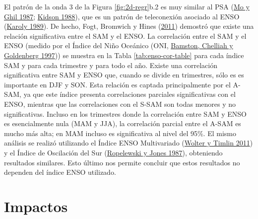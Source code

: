 \documentclass[12pt,oneside,a4paper]{reedthesis}
\begin{document}
El patrón de la onda 3 de la Figura \ref{fig:2d-regr}b.2 es muy similar al PSA (\protect\hyperlink{ref-mo1987}{Mo y Ghil 1987}; \protect\hyperlink{ref-kidson1988}{Kidson 1988}), que es un patrón de teleconexión asociado al ENSO (\protect\hyperlink{ref-karoly1989}{Karoly 1989}).
De hecho, Fogt, Bromwich y Hines (\protect\hyperlink{ref-fogt2011a}{2011}) demostró que existe una relación significativa entre el SAM y el ENSO.
La correlación entre el SAM y el ENSO (medido por el Índice del Niño Oceánico (ONI, \protect\hyperlink{ref-bamston1997}{Bamston, Chelliah y Goldenberg 1997})) se muestra en la Tabla \ref{tab:enso-cor-table} para cada índice SAM y para cada trimestre y para todo el año.
Existe una correlación significativa entre SAM y ENSO que, cuando se divide en trimestres, sólo es es importante en DJF y SON.
Esta relación es captada principalmente por el A-SAM, ya que este índice presenta correlaciones parciales significativas con el ENSO, mientras que las correlaciones con el S-SAM son todas menores y no significativas.
Incluso en los trimestres donde la correlación entre SAM y ENSO es esencialmente nula (MAM y JJA), la correlación parcial entre el A-SAM es mucho más alta; en MAM incluso es significativa al nivel del 95\%.
El mismo análisis se realizó utilizando el Índice ENSO Multivariado (\protect\hyperlink{ref-wolter2011}{Wolter y Timlin 2011}) y el Índice de Oscilación del Sur (\protect\hyperlink{ref-ropelewski1987}{Ropelewski y Jones 1987}), obteniendo resultados similares.
Esto último nos permite concluir que estos resultados no dependen del índice ENSO utilizado.

\hypertarget{impacts}{%
\section{Impactos}\label{impacts}}
\end{document}

